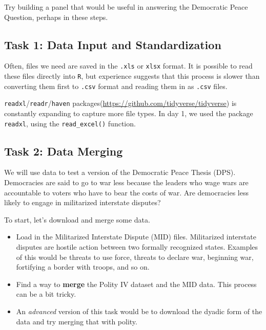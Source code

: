 \documentclass[]{book}
\providecommand{\tightlist}{%
  \setlength{\itemsep}{0pt}\setlength{\parskip}{0pt}}
\theoremstyle{definition}
\theoremstyle{definition}
\theoremstyle{definition}
\theoremstyle{remark}
\begin{document}
Try building a panel that would be useful in answering the Democratic
Peace Question, perhaps in these steps.

\subsection*{Task 1: Data Input and
Standardization}\label{task-1-data-input-and-standardization}

Often, files we need are saved in the \texttt{.xls} or \texttt{xlsx}
format. It is possible to read these files directly into \texttt{R}, but
experience suggests that this process is slower than converting them
first to \texttt{.csv} format and reading them in as \texttt{.csv}
files.

\texttt{readxl}/\texttt{readr}/\texttt{haven}
packages(\url{https://github.com/tidyverse/tidyverse}) is constantly
expanding to capture more file types. In day 1, we used the package
\texttt{readxl}, using the \texttt{read\_excel()} function.

\subsection*{Task 2: Data Merging}\label{task-2-data-merging}

We will use data to test a version of the Democratic Peace Thesis (DPS).
Democracies are said to go to war less because the leaders who wage wars
are accountable to voters who have to bear the costs of war. Are
democracies less likely to engage in militarized interstate disputes?

To start, let's download and merge some data.

\begin{itemize}
\tightlist
\item
  Load in the Militarized Interstate Dispute (MID) files. Militarized
  interstate disputes are hostile action between two formally recognized
  states. Examples of this would be threats to use force, threats to
  declare war, beginning war, fortifying a border with troops, and so
  on.
\item
  Find a way to \textbf{merge} the Polity IV dataset and the MID data.
  This process can be a bit tricky.
\item
  An \emph{advanced} version of this task would be to download the
  dyadic form of the data and try merging that with polity.
\end{itemize}
\end{document}
